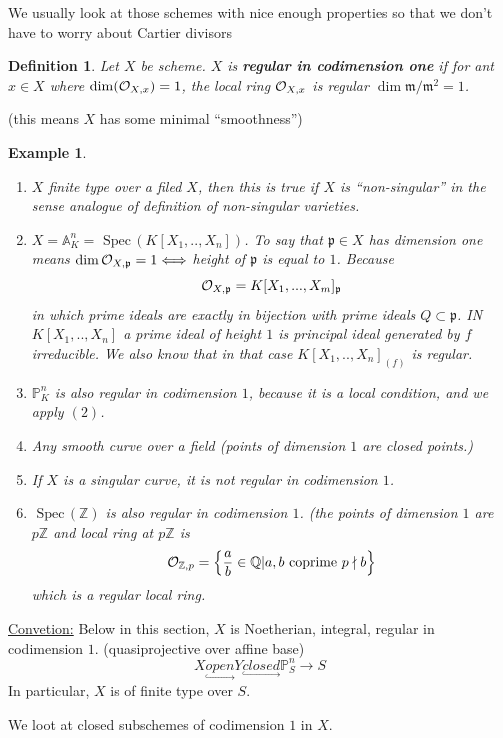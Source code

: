 \documentclass[11pt]{article}
\newtheorem{dfn}[thm]{Definition}
\newtheorem{ex}[thm]{Example}
\newcommand{\spec}{\text{ Spec}\,}
\newcommand{\affn}{\mathbb A}
\newcommand{\proj}{\mathbb P}
\newcommand{\intg}{\mathbb Z}
\newcommand{\ratl}{\mathbb Q}
\newcommand{\scm}{{\mathfrak m}}
\newcommand{\scp}{{\mathfrak p}}
\newcommand{\calo}{{\cal O}}
\newcommand{\lrta}{\longrightarrow}
\newcommand{\Llrta}{\Longleftrightarrow}
\newcommand{\inj}{\hookrightarrow}
\begin{document}
We usually look at those schemes with nice enough properties so that we don't have to worry about Cartier divisors
\begin{dfn}
Let $X$ be scheme. $X$ is \textbf{regular in codimension one} if for ant $x\in X$ where $\dim(\calo_{X,x})=1$, the local ring $\calo_{X,x}$ is regular $\dim \scm/\scm^2=1$.
\end{dfn}
(this means $X$ has some minimal ``smoothness'')
\begin{ex}
\ \begin{enumerate}[label=(\arabic*)]
\item $X$ finite type over a filed $X$, then this is true if $X$ is ``non-singular'' in the sense analogue of definition of non-singular varieties.
\item $X=\affn_K^n=\spec(K[X_1,..,X_n])$. To say that $\scp\in X$ has dimension one means $\dim \calo_{X,\scp}=1\Llrta $ height of $\scp$ is equal to $1$. Because
$$
\calo_{X,\scp}=K[X_1,...,X_m]_{\scp} 
$$
in which prime ideals are exactly in bijection with prime ideals $Q\subset \scp$. IN $K[X_1,..,X_n]$ a prime ideal of height $1$ is principal ideal generated by $f$ irreducible. We also know that in that case $K[X_1,..,X_n]_{(f)}$ is regular.
\item $\proj^n_K$ is also regular in codimension $1$, because it is a local condition, and we apply $(2)$.
\item Any smooth curve over a field (points of dimension $1$ are closed points.)
\item If $X$ is a singular curve, it is not regular in codimension $1$.
\item $\spec(\intg)$ is also regular in codimension $1$. (the points of dimension $1$ are $p\intg$ and local ring  at $p\intg$ is 
$$
\calo_{\intg,p}=\left\{\frac{a}{b}\in \ratl| a,b \text{ coprime } p\nmid b\right\}
$$
which is a regular local ring.
\end{enumerate}
\end{ex}
\underline{Convetion:} Below in this section, $X$ is Noetherian, integral, regular in codimension $1$. (quasiprojective over affine base)
$$
X\underset{\inj}{open} Y\underset{\inj}{closed} \proj^n_S\lrta S
$$
In particular, $X$ is of finite type over $S$.

We loot at closed subschemes of codimension $1$ in $X$.
\end{document}
